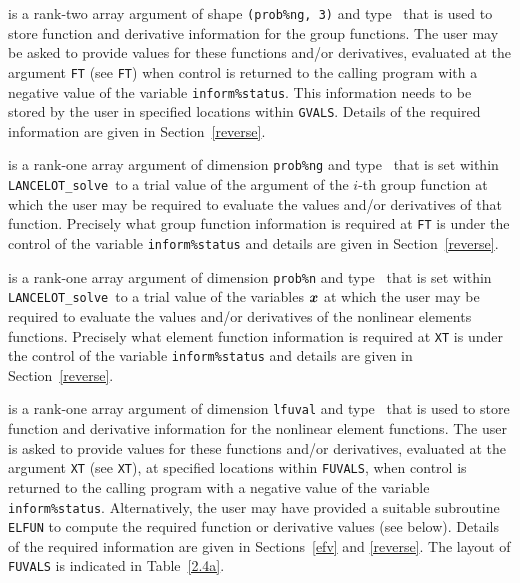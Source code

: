 \documentclass{galahad}
\newcommand{\fullpackagename}{LANC\-E\-LOT}
\newcommand{\solver}{{\tt \fullpackagename\_solve}}
\begin{document}
\begin{description}
 is a rank-two \intentout array argument of
shape {\tt (prob\%ng, 3)} and type \realdp\,
that is used to store function and derivative information for the
group functions. The user may be asked to provide values for these functions
and/or derivatives, evaluated at
the argument {\tt FT} (see {\tt FT})
when control is returned to the calling
program with a negative value of the variable {\tt inform\%status}.
This information needs to be stored by the user
in specified locations within {\tt GVALS}.
Details of the required information are given in Section~\ref{reverse}.

 is a rank-one \intentinout array argument of
dimension {\tt prob\%ng} and type \realdp\, that is set within \solver\
to a trial value of the argument of the $i$-th group function
at which the user may be required to evaluate the values and/or derivatives
of that function. Precisely what group function information
is required at {\tt FT} is under the control of the
variable {\tt inform\%status} and details are given in Section~\ref{reverse}.

 is a rank-one \intentinout array argument of
dimension {\tt prob\%n} and type \realdp\, that is set within \solver\
to a trial value of the variables ${\bm{x}}$ at which the
user may be required to evaluate the values and/or derivatives
of the nonlinear elements functions. Precisely what element function
information is required at {\tt XT} is under the control of the
variable {\tt inform\%status} and details are given in Section~\ref{reverse}.

\itt{FUVALS} is a rank-one \intentinout array argument of
dimension {\tt lfuval} and type \realdp\, that is used to store
function and derivative information for the nonlinear element functions.
The user is asked to provide values for these functions and/or derivatives,
evaluated at the argument {\tt XT} (see {\tt XT}), at specified
locations within {\tt FUVALS}, when control is returned to the calling
program with a negative value of the variable {\tt inform\%status}.
Alternatively, the user may have provided a suitable subroutine {\tt ELFUN}
to compute the required function or derivative values (see below). Details
of the required information are given in Sections~\ref{efv} and \ref{reverse}.
The layout of {\tt FUVALS} is indicated in Table~\ref{2.4a}.


\end{description}
\end{document}

